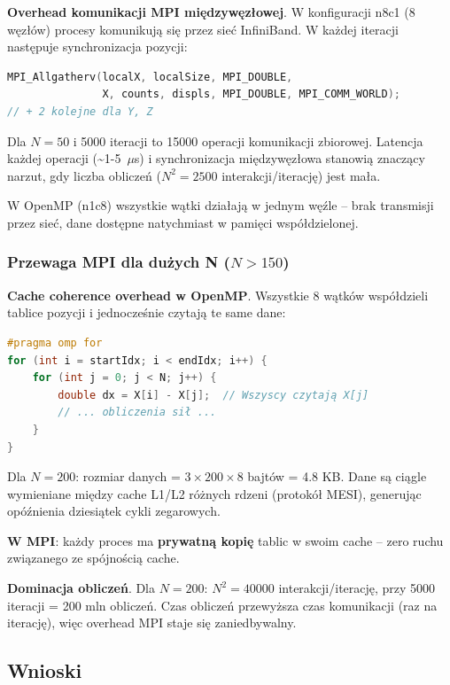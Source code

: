 \textbf{Overhead komunikacji MPI międzywęzłowej}. W konfiguracji n8c1 (8 węzłów) procesy komunikują się przez sieć InfiniBand. W każdej iteracji następuje synchronizacja pozycji:

\begin{lstlisting}[language=C]
MPI_Allgatherv(localX, localSize, MPI_DOUBLE,
               X, counts, displs, MPI_DOUBLE, MPI_COMM_WORLD);
// + 2 kolejne dla Y, Z
\end{lstlisting}

Dla $N=50$ i 5000 iteracji to 15000 operacji komunikacji zbiorowej. Latencja każdej operacji (\textasciitilde{}1-5~$\mu$s) i synchronizacja międzywęzłowa stanowią znaczący narzut, gdy liczba obliczeń ($N^2 = 2500$ interakcji/iterację) jest mała.

W OpenMP (n1c8) wszystkie wątki działają w jednym węźle -- brak transmisji przez sieć, dane dostępne natychmiast w pamięci współdzielonej.

\subsubsection{Przewaga MPI dla dużych N ($N > 150$)}

\textbf{Cache coherence overhead w OpenMP}. Wszystkie 8 wątków współdzieli tablice pozycji i jednocześnie czytają te same dane:

\begin{lstlisting}[language=C]
#pragma omp for
for (int i = startIdx; i < endIdx; i++) {
    for (int j = 0; j < N; j++) {
        double dx = X[i] - X[j];  // Wszyscy czytają X[j]
        // ... obliczenia sił ...
    }
}
\end{lstlisting}

Dla $N=200$: rozmiar danych = $3 \times 200 \times 8$ bajtów = 4.8 KB. Dane są ciągle wymieniane między cache L1/L2 różnych rdzeni (protokół MESI), generując opóźnienia dziesiątek cykli zegarowych.

\textbf{W MPI}: każdy proces ma \textbf{prywatną kopię} tablic w swoim cache -- zero ruchu związanego ze spójnością cache.

\textbf{Dominacja obliczeń}. Dla $N=200$: $N^2 = 40000$ interakcji/iterację, przy 5000 iteracji = 200 mln obliczeń. Czas obliczeń przewyższa czas komunikacji (raz na iterację), więc overhead MPI staje się zaniedbywalny.

\subsection{Wnioski}

